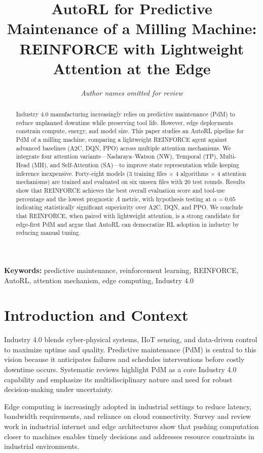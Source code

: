 \documentclass[11pt]{article}
\title{AutoRL for Predictive Maintenance of a Milling Machine:\\
REINFORCE with Lightweight Attention at the Edge}
\author{\textit{Author names omitted for review}}
\date{}
\begin{document}
\maketitle

\begin{abstract}
Industry 4.0 manufacturing increasingly relies on predictive maintenance (PdM) to reduce unplanned downtime while preserving tool life. However, edge deployments constrain compute, energy, and model size. This paper studies an AutoRL pipeline for PdM of a milling machine, comparing a lightweight REINFORCE agent against advanced baselines (A2C, DQN, PPO) across multiple attention mechanisms. We integrate four attention variants---Nadaraya--Watson (NW), Temporal (TP), Multi-Head (MH), and Self-Attention (SA)---to improve state representation while keeping inference inexpensive. Forty-eight models (3 training files $\times$ 4 algorithms $\times$ 4 attention mechanisms) are trained and evaluated on six unseen files with 20 test rounds. Results show that REINFORCE achieves the best overall evaluation score and tool-use percentage and the lowest prognostic $\Lambda$ metric, with hypothesis testing at $\alpha=0.05$ indicating statistically significant superiority over A2C, DQN, and PPO. We conclude that REINFORCE, when paired with lightweight attention, is a strong candidate for edge-first PdM and argue that AutoRL can democratize RL adoption in industry by reducing manual tuning.
\end{abstract}

\textbf{Keywords:} predictive maintenance, reinforcement learning, REINFORCE, AutoRL, attention mechanism, edge computing, Industry 4.0

\section{Introduction and Context}
Industry 4.0 blends cyber-physical systems, IIoT sensing, and data-driven control to maximize uptime and quality. Predictive maintenance (PdM) is central to this vision because it anticipates failures and schedules interventions before costly downtime occurs. Systematic reviews highlight PdM as a core Industry 4.0 capability and emphasize its multidisciplinary nature and need for robust decision-making under uncertainty. \cite{Zonta2020PdMReview}

Edge computing is increasingly adopted in industrial settings to reduce latency, bandwidth requirements, and reliance on cloud connectivity. Survey and review work in industrial internet and edge architectures show that pushing computation closer to machines enables timely decisions and addresses resource constraints in industrial environments. \cite{EdgeIndustrialInternet2021,EdgeComputingIndustrialMachines2019}
\end{document}
